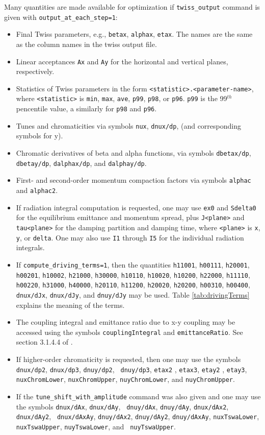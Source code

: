 \documentclass[11pt]{article}
\begin{document}
\begin{itemize}
Many quantities are made available for optimization if \verb|twiss_output| command is given
with \verb|output_at_each_step=1|:
\begin{itemize} 
\item Final Twiss parameters, e.g., \verb|betax|, \verb|alphax|, \verb|etax|.  The names
are the same as the column names in the twiss output file.
\item Linear acceptances \verb|Ax| and \verb|Ay| for the horizontal and vertical planes, respectively.
\item Statistics of Twiss parameters in the form \verb|<statistic>.<parameter-name>|,
where \verb|<statistic>| is \verb|min|, \verb|max|, \verb|ave|, \verb|p99|, \verb|p98|, or
\verb|p96|.  \verb|p99| is the 99$^{th}$ pencentile value, a similarly for \verb|p98| and \verb|p96|.
\item Tunes and chromaticities via symbols \verb|nux|, \verb|dnux/dp|, (and corresponding
symbols for y).
\item Chromatic derivatives of beta and alpha functions, via symbols
\verb|dbetax/dp|, \verb|dbetay/dp|, \verb|dalphax/dp|, and \verb|dalphay/dp|.
\item First- and second-order momentum compaction factors via symbols \verb|alphac| and \verb|alphac2|.  
\item If radiation integral computation is requested,  one may use \verb|ex0| and \verb|Sdelta0| for
the equilibrium emittance and momentum spread, plus \verb|J<plane>|
and \verb|tau<plane>| for the damping partition and damping time,
where \verb|<plane>| is \verb|x|, \verb|y|, or \verb|delta|.  One may also use
\verb|I1| through \verb|I5| for the individual radiation integrals.
\item If \verb|compute_driving_terms=1|, then the quantities
{\tt h11001}, {\tt h00111}, {\tt h20001}, {\tt h00201}, {\tt h10002}, {\tt h21000}, {\tt h30000}, {\tt h10110}, {\tt h10020},
{\tt h10200}, {\tt h22000}, {\tt h11110}, {\tt h00220}, {\tt h31000}, {\tt h40000}, {\tt h20110}, {\tt h11200}, {\tt h20020},
{\tt h20200}, {\tt h00310}, {\tt h00400}, {\tt dnux/dJx}, {\tt dnux/dJy},  and {\tt dnuy/dJy} 
may be used.  Table \ref{tab:drivingTerms} explains the meaning of the terms.
\item The coupling integral and emittance ratio due to x-y coupling may
be accessed using the symbols \verb|couplingIntegral| and
\verb|emittanceRatio|.  See section 3.1.4.4 of \cite{HAPE}.
\item If higher-order chromaticity is requested, then one may use the
  symbols {\tt dnux/dp2}, {\tt dnux/dp3}, {\tt dnuy/dp2}, {\tt
    dnuy/dp3}, {\tt etax2} , {\tt etax3}, {\tt etay2} , {\tt etay3},
  {\tt nuxChromLower}, {\tt nuxChromUpper}, {\tt nuyChromLower}, and
  {\tt nuyChromUpper}.
\item If the \verb|tune_shift_with_amplitude| command was also given
  and one may use the symbols {\tt dnux/dAx}, {\tt dnux/dAy}, {\tt
    dnuy/dAx}, {\tt dnuy/dAy}, {\tt dnux/dAx2}, {\tt dnux/dAy2}, {\tt
    dnux/dAxAy}, {\tt dnuy/dAx2}, {\tt dnuy/dAy2}, {\tt dnuy/dAxAy},
  {\tt nuxTswaLower}, {\tt nuxTswaUpper}, {\tt nuyTswaLower}, and {\tt
    nuyTswaUpper}.


\end{itemize}
\end{itemize}
\end{document}
